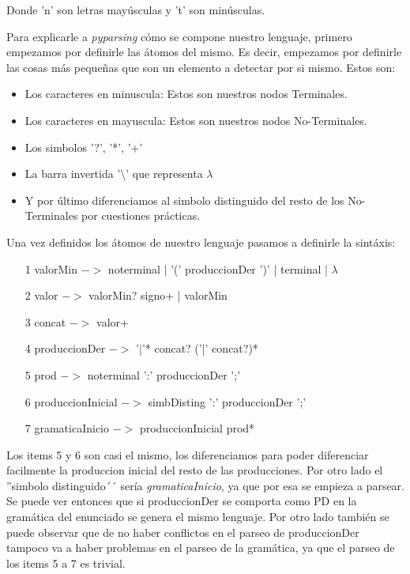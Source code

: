 \documentclass[a4paper]{report}
\begin{document}
Donde 'n' son letras mayúsculas y 't' son minúsculas.



Para explicarle a \emph{pyparsing} cómo se compone nuestro lenguaje, primero empezamos por definirle las átomos del mismo. Es decir, empezamos por definirle las cosas más pequeñas que son un elemento a detectar por si mismo. Estos son:
\begin{itemize}
\item Los caracteres en minuscula: Estos son nuestros nodos Terminales.
\item Los caracteres en mayuscula: Estos son nuestros nodos No-Terminales.
\item Los simbolos '?', '*', '+'
\item La barra invertida '\textbackslash' que representa $\lambda$
\item Y por último diferenciamos al simbolo distinguido del resto de los No-Terminales por cuestiones prácticas.
\end{itemize}



Una vez definidos los átomos de nuestro lenguaje pasamos a definirle la sintáxis:
\begin{itemize}
\item[1] valorMin $->$ noterminal | '(' produccionDer ')' | terminal | $\lambda$
\item[2] valor $->$ valorMin? signo+ | valorMin
\item[3] concat $->$ valor+
\item[4] produccionDer $->$ '|'* concat? ('|' concat?)*
\item[5] prod $->$ noterminal ':' produccionDer ';'
\item[6] produccionInicial $->$ simbDisting ':' produccionDer ';'
\item[7] gramaticaInicio $->$ produccionInicial prod*
\end{itemize}

Los items 5 y 6 son casi el mismo, los diferenciamos para poder diferenciar facilmente la produccion inicial del resto de las producciones. Por otro lado el ''simbolo distinguido´´ sería \emph{gramaticaInicio}, ya que por esa se empieza a parsear. Se puede ver entonces que si produccionDer se comporta como PD en la gramática del enunciado se genera el mismo lenguaje. Por otro lado también se puede observar que de no haber conflictos en el parseo de produccionDer tampoco va a haber problemas en el parseo de la gramática, ya que el parseo de los items 5 a 7 es trivial.
\end{document}
